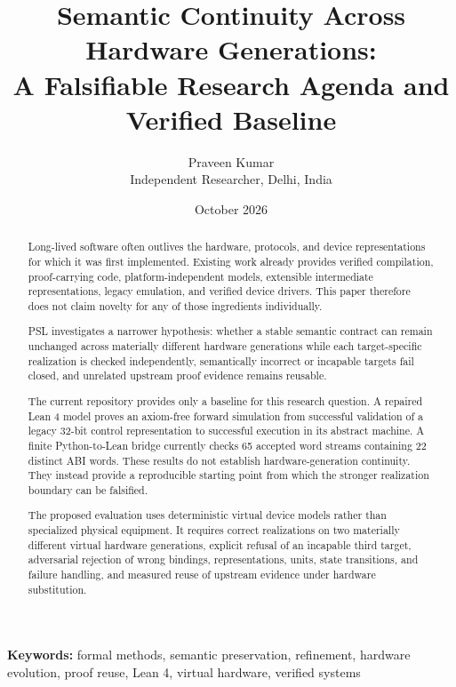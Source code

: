 \documentclass[11pt,a4paper]{article}
\begin{document}
\title{Semantic Continuity Across Hardware Generations:\\
       A Falsifiable Research Agenda and Verified Baseline}

\author{Praveen Kumar\\Independent Researcher, Delhi, India}
\date{October 2026}

\maketitle

\begin{abstract}
Long-lived software often outlives the hardware, protocols, and device
representations for which it was first implemented. Existing work already
provides verified compilation, proof-carrying code, platform-independent
models, extensible intermediate representations, legacy emulation, and
verified device drivers. This paper therefore does not claim novelty for any
of those ingredients individually.

PSL investigates a narrower hypothesis: whether a stable semantic contract can
remain unchanged across materially different hardware generations while each
target-specific realization is checked independently, semantically incorrect
or incapable targets fail closed, and unrelated upstream proof evidence
remains reusable.

The current repository provides only a baseline for this research question. A
repaired Lean 4 model proves an axiom-free forward simulation from successful
validation of a legacy 32-bit control representation to successful execution
in its abstract machine. A finite Python-to-Lean bridge currently checks 65
accepted word streams containing 22 distinct ABI words. These results do not
establish hardware-generation continuity. They instead provide a reproducible
starting point from which the stronger realization boundary can be falsified.

The proposed evaluation uses deterministic virtual device models rather than
specialized physical equipment. It requires correct realizations on two
materially different virtual hardware generations, explicit refusal of an
incapable third target, adversarial rejection of wrong bindings,
representations, units, state transitions, and failure handling, and measured
reuse of upstream evidence under hardware substitution.
\end{abstract}

\noindent\textbf{Keywords:}
formal methods, semantic preservation, refinement, hardware evolution,
proof reuse, Lean 4, virtual hardware, verified systems
\end{document}
